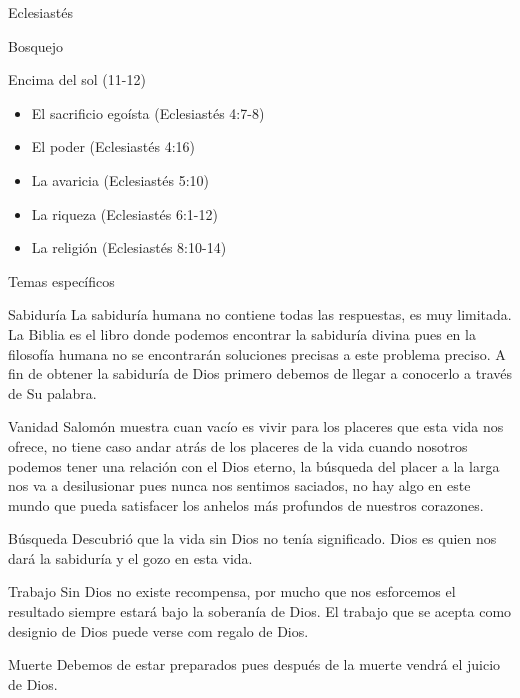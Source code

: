 \begin{section}{Eclesiastés}
\begin{subsection}{Bosquejo}
\begin{subsubsection}{Encima del sol (11-12)}
\begin{itemize}
			\item El sacrificio egoísta (Eclesiastés 4:7-8)
			\item El poder (Eclesiastés 4:16)
			\item La avaricia (Eclesiastés 5:10)
			\item La riqueza (Eclesiastés 6:1-12)
			\item La religión (Eclesiastés 8:10-14)
		\end{itemize}
	\end{subsubsection}
\end{subsection}
\begin{subsection}{Temas específicos}
	\begin{subsubsection}{Sabiduría}
		La sabiduría humana no contiene todas las respuestas, es muy limitada. La Biblia es el libro donde podemos encontrar la sabiduría divina pues en la filosofía humana no se encontrarán soluciones precisas a este problema preciso. A fin de obtener la sabiduría de Dios primero debemos de llegar a conocerlo a través de Su palabra.
	\end{subsubsection}
	\begin{subsubsection}{Vanidad}
Salomón muestra cuan vacío es vivir para los placeres que esta vida nos ofrece, no tiene caso andar atrás de los placeres de la vida cuando nosotros podemos tener una relación con el Dios eterno, la búsqueda del placer a la larga nos va a desilusionar pues nunca nos sentimos saciados, no hay algo en este mundo que pueda satisfacer los anhelos más profundos de nuestros corazones.
	\end{subsubsection}
	\begin{subsubsection}{Búsqueda}
Descubrió que la vida sin Dios no tenía significado. Dios es quien nos dará la sabiduría y el gozo en esta vida.
	\end{subsubsection}
	\begin{subsubsection}{Trabajo}
Sin Dios no existe recompensa, por mucho que nos esforcemos el resultado siempre estará bajo la soberanía de Dios. El trabajo que se acepta como designio de Dios puede verse com regalo de Dios.
	\end{subsubsection}
	\begin{subsubsection}{Muerte}
Debemos de estar preparados pues después de la muerte vendrá el juicio de Dios.
	\end{subsubsection}
	\end{subsection}
\end{section}
%


